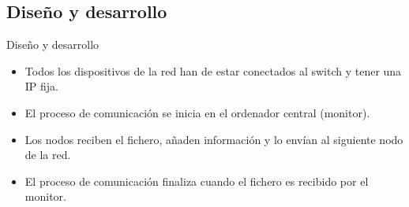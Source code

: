 \documentclass[aspectratio=169]{beamer}
\begin{document}
\subsection{Diseño y desarrollo}
\begin{frame}{Diseño y desarrollo}
\begin{itemize}
	\item Todos los dispositivos de la red han de estar conectados al switch y tener una IP fija.
	\item El proceso de comunicación se inicia en el ordenador central (monitor).
	\item Los nodos reciben el fichero, añaden información y lo envían al siguiente nodo de la red.
	\item El proceso de comunicación finaliza cuando el fichero es recibido por el monitor.
\end{itemize}
\end{frame}
\end{document}
